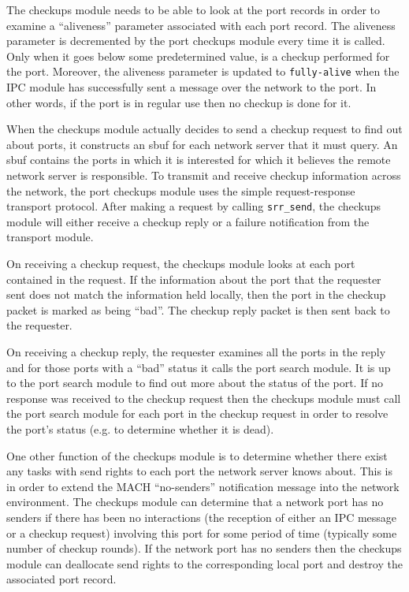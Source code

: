 The checkups module needs to be able to look at the port records in order to
examine a ``aliveness'' parameter associated with each port record.  The
aliveness parameter is decremented by the port checkups module every time it
is called.  Only when it goes below some predetermined value, is a checkup
performed for the port.  Moreover, the aliveness parameter is updated to
\verb"fully-alive" when the IPC module has successfully sent a message over
the network to the port.  In other words, if the port is in regular use then
no checkup is done for it.

When the checkups module actually decides to send a checkup request to find
out about ports, it constructs an sbuf for each network server that it must
query.  An sbuf contains the ports in which it is interested for which it
believes the remote network server is responsible.  To transmit and receive
checkup information across the network, the port checkups module uses the
simple request-response transport protocol.  After making a request by
calling \verb"srr_send", the checkups module will either receive a checkup
reply or a failure notification from the transport module.

On receiving a checkup request, the checkups module looks at each port
contained in the request.  If the information about the port that the
requester sent does not match the information held locally, then the port in
the checkup packet is marked as being ``bad''.  The checkup reply packet is
then sent back to the requester.

On receiving a checkup reply, the requester examines all the ports in the
reply and for those ports with a ``bad'' status it calls the port search
module.  It is up to the port search module to find out more about the
status of the port.  If no response was received to the checkup request then
the checkups module must call the port search module for each port in the
checkup request in order to resolve the port's status (e.g. to determine
whether it is dead).

One other function of the checkups module is to determine whether there
exist any tasks with send rights to each port the network server knows
about.  This is in order to extend the MACH ``no-senders'' notification
message into the network environment.  The checkups module can determine
that a network port has no senders if there has been no interactions (the
reception of either an IPC message or a checkup request) involving this port
for some period of time (typically some number of checkup rounds).  If the
network port has no senders then the checkups module can deallocate send
rights to the corresponding local port and destroy the associated port
record.

